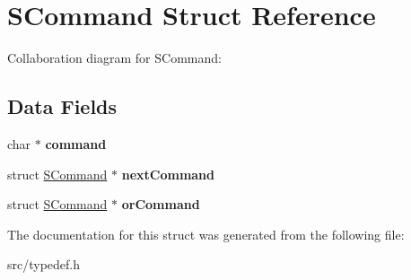 \hypertarget{structSCommand}{}\section{S\+Command Struct Reference}
\label{structSCommand}


Collaboration diagram for S\+Command\+:
\subsection*{Data Fields}
\begin{DoxyCompactItemize}
\item 
\mbox{\label{structSCommand_aaefab3b876eb47ae3f8177805d160a60}} 
char $\ast$ {\bfseries command}
\item 
\mbox{\label{structSCommand_af71198d0a588a00bf562ed9f38ad335d}} 
struct \hyperlink{structSCommand}{S\+Command} $\ast$ {\bfseries next\+Command}
\item 
\mbox{\label{structSCommand_a9018ea1c73cc624f3a5023bb5f0f9225}} 
struct \hyperlink{structSCommand}{S\+Command} $\ast$ {\bfseries or\+Command}
\end{DoxyCompactItemize}


The documentation for this struct was generated from the following file\+:\begin{DoxyCompactItemize}
\item 
src/typedef.\+h\end{DoxyCompactItemize}

